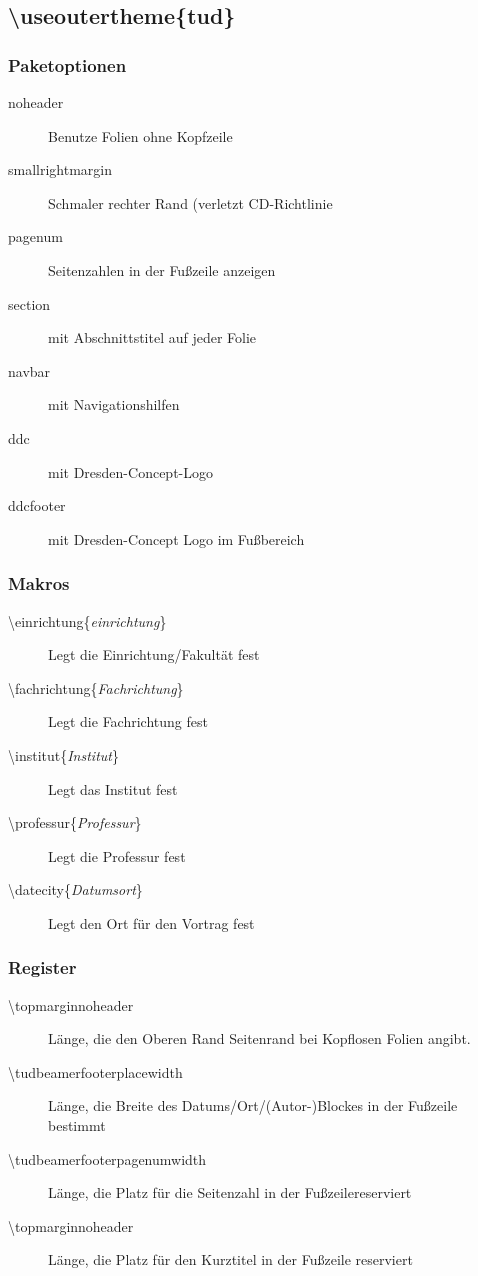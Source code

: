 \documentclass[presentation,t]{beamer}
\begin{document}
\subsection{\textbackslash useoutertheme\{tud\}}
\label{sec-2-2}
\begin{frame}
\frametitle{Paketoptionen}
\label{sec-2-2-1}

\begin{description}
\item[noheader] Benutze Folien ohne Kopfzeile
\item[smallrightmargin] Schmaler rechter Rand (verletzt CD-Richtlinie
\item[pagenum] Seitenzahlen in der Fußzeile anzeigen
\item[section] mit Abschnittstitel auf jeder Folie
\item[navbar] mit Navigationshilfen
\item[ddc] mit Dresden-Concept-Logo
\item[ddcfooter] mit Dresden-Concept Logo im Fußbereich
\end{description}
\end{frame}
\begin{frame}
\frametitle{Makros}
\label{sec-2-2-2}

\begin{description}
\item[\textbackslash einrichtung\{\emph{einrichtung}\}] Legt die
 Einrichtung/Fakultät fest
\item[\textbackslash fachrichtung\{\emph{Fachrichtung}\}] Legt die
 Fachrichtung fest
\item[\textbackslash institut\{\emph{Institut}\}] Legt das
 Institut fest
\item[\textbackslash professur\{\emph{Professur}\}] Legt die
 Professur fest
\item[\textbackslash datecity\{\emph{Datumsort}\}] Legt den Ort für den Vortrag fest
\end{description}
\end{frame}
\begin{frame}
\frametitle{Register}
\label{sec-2-2-3}

\begin{description}
\item[\textbackslash topmarginnoheader] Länge, die den Oberen Rand Seitenrand bei
 Kopflosen Folien angibt.
\item[\textbackslash tudbeamerfooterplacewidth] Länge, die Breite des
     Datums/Ort/(Autor-)Blockes in der Fußzeile bestimmt
\item[\textbackslash tudbeamerfooterpagenumwidth] Länge, die Platz für
     die Seitenzahl in der Fußzeilereserviert
\item[\textbackslash topmarginnoheader] Länge, die Platz für den
     Kurztitel in der Fußzeile reserviert
\end{description}
\end{frame}
\end{document}
